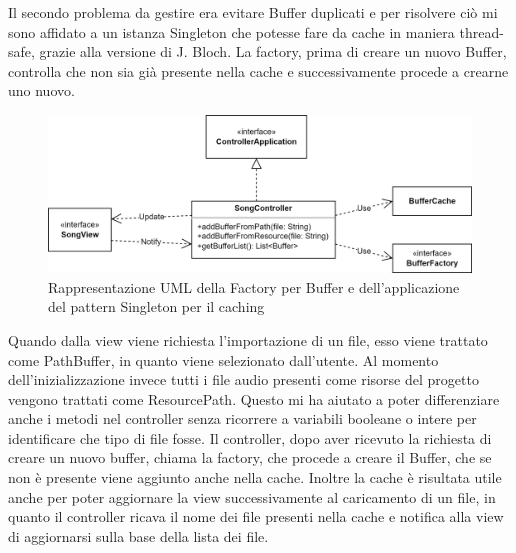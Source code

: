 \documentclass[a4paper,12pt]{report}
\begin{document}
Il secondo problema da gestire era evitare Buffer duplicati e per risolvere ciò mi sono affidato a un istanza Singleton che potesse fare da cache in maniera thread-safe, grazie alla versione di J. Bloch. La factory, prima di creare un nuovo Buffer, controlla che non sia già presente nella cache e successivamente procede a crearne uno nuovo.
%
\begin{figure}[H]
\centering{}
\includegraphics[width=\textwidth]{img/buffer/BufferMVC.png}
\caption{Rappresentazione UML della Factory per Buffer e dell’applicazione del pattern Singleton per il caching}
\label{img:buffermvc}
\end{figure}
Quando dalla view viene richiesta l’importazione di un file, esso viene trattato come PathBuffer, in quanto viene selezionato dall’utente. Al momento dell’inizializzazione invece tutti i file audio presenti come risorse del progetto vengono trattati come ResourcePath. Questo mi ha aiutato a poter differenziare anche i metodi nel controller senza ricorrere a variabili booleane o intere per identificare che tipo di file fosse. Il controller, dopo aver ricevuto la richiesta di creare un nuovo buffer, chiama la factory, che procede a creare il Buffer, che se non è presente viene aggiunto anche nella cache. Inoltre la cache è risultata utile anche per poter aggiornare la view successivamente al caricamento di un file, in quanto il controller ricava il nome dei file presenti nella cache e notifica alla view di aggiornarsi sulla base della lista dei file.
%
\end{document}
